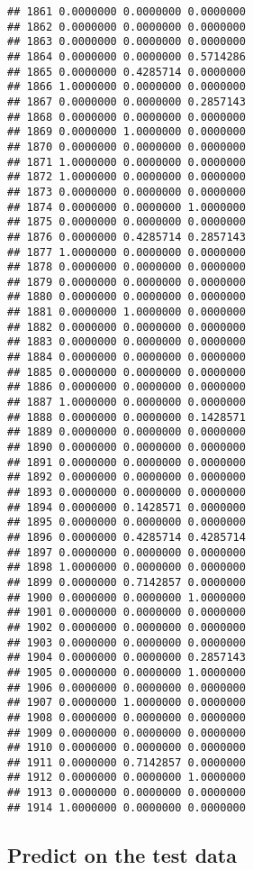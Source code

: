 \documentclass[
]{article}
\newenvironment{Shaded}{\begin{snugshade}}{\end{snugshade}}
\newcommand{\AttributeTok}[1]{\textcolor[rgb]{0.13,0.29,0.53}{#1}}
\newcommand{\DecValTok}[1]{\textcolor[rgb]{0.00,0.00,0.81}{#1}}
\newcommand{\FunctionTok}[1]{\textcolor[rgb]{0.13,0.29,0.53}{\textbf{#1}}}
\newcommand{\NormalTok}[1]{#1}
\newcommand{\OtherTok}[1]{\textcolor[rgb]{0.56,0.35,0.01}{#1}}
\newcommand{\SpecialCharTok}[1]{\textcolor[rgb]{0.81,0.36,0.00}{\textbf{#1}}}
\newcommand{\StringTok}[1]{\textcolor[rgb]{0.31,0.60,0.02}{#1}}
\begin{document}
\begin{verbatim}
## 1861 0.0000000 0.0000000 0.0000000
## 1862 0.0000000 0.0000000 0.0000000
## 1863 0.0000000 0.0000000 0.0000000
## 1864 0.0000000 0.0000000 0.5714286
## 1865 0.0000000 0.4285714 0.0000000
## 1866 1.0000000 0.0000000 0.0000000
## 1867 0.0000000 0.0000000 0.2857143
## 1868 0.0000000 0.0000000 0.0000000
## 1869 0.0000000 1.0000000 0.0000000
## 1870 0.0000000 0.0000000 0.0000000
## 1871 1.0000000 0.0000000 0.0000000
## 1872 1.0000000 0.0000000 0.0000000
## 1873 0.0000000 0.0000000 0.0000000
## 1874 0.0000000 0.0000000 1.0000000
## 1875 0.0000000 0.0000000 0.0000000
## 1876 0.0000000 0.4285714 0.2857143
## 1877 1.0000000 0.0000000 0.0000000
## 1878 0.0000000 0.0000000 0.0000000
## 1879 0.0000000 0.0000000 0.0000000
## 1880 0.0000000 0.0000000 0.0000000
## 1881 0.0000000 1.0000000 0.0000000
## 1882 0.0000000 0.0000000 0.0000000
## 1883 0.0000000 0.0000000 0.0000000
## 1884 0.0000000 0.0000000 0.0000000
## 1885 0.0000000 0.0000000 0.0000000
## 1886 0.0000000 0.0000000 0.0000000
## 1887 1.0000000 0.0000000 0.0000000
## 1888 0.0000000 0.0000000 0.1428571
## 1889 0.0000000 0.0000000 0.0000000
## 1890 0.0000000 0.0000000 0.0000000
## 1891 0.0000000 0.0000000 0.0000000
## 1892 0.0000000 0.0000000 0.0000000
## 1893 0.0000000 0.0000000 0.0000000
## 1894 0.0000000 0.1428571 0.0000000
## 1895 0.0000000 0.0000000 0.0000000
## 1896 0.0000000 0.4285714 0.4285714
## 1897 0.0000000 0.0000000 0.0000000
## 1898 1.0000000 0.0000000 0.0000000
## 1899 0.0000000 0.7142857 0.0000000
## 1900 0.0000000 0.0000000 1.0000000
## 1901 0.0000000 0.0000000 0.0000000
## 1902 0.0000000 0.0000000 0.0000000
## 1903 0.0000000 0.0000000 0.0000000
## 1904 0.0000000 0.0000000 0.2857143
## 1905 0.0000000 0.0000000 1.0000000
## 1906 0.0000000 0.0000000 0.0000000
## 1907 0.0000000 1.0000000 0.0000000
## 1908 0.0000000 0.0000000 0.0000000
## 1909 0.0000000 0.0000000 0.0000000
## 1910 0.0000000 0.0000000 0.0000000
## 1911 0.0000000 0.7142857 0.0000000
## 1912 0.0000000 0.0000000 1.0000000
## 1913 0.0000000 0.0000000 0.0000000
## 1914 1.0000000 0.0000000 0.0000000
\end{verbatim}

\subsection{Predict on the test data}\label{predict-on-the-test-data}

\begin{Shaded}
\end{Shaded}
\end{document}
